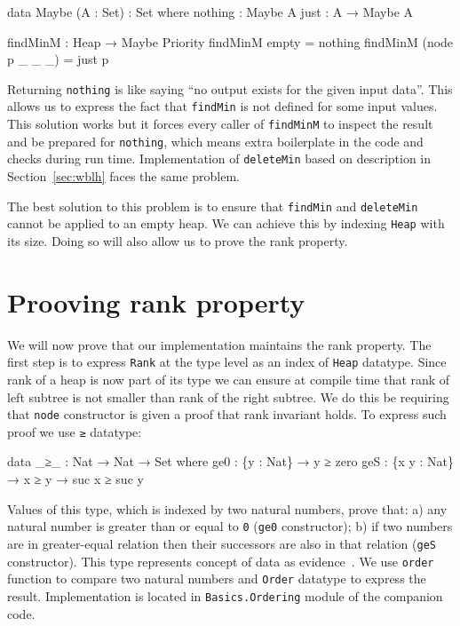 \begin{code}
data Maybe (A : Set) : Set where
  nothing : Maybe A
  just    : A → Maybe A

findMinM : Heap → Maybe Priority
findMinM empty          = nothing
findMinM (node p _ _ _) = just p
\end{code}

\noindent
Returning \texttt{nothing} is like saying ``no output exists for the given input data''. This allows us to express the fact that \texttt{findMin} is not defined for some input values. This solution works but it forces every caller of \texttt{findMinM} to inspect the result and be prepared for \texttt{nothing}, which means extra boilerplate in the code and checks during run time. Implementation of \texttt{deleteMin} based on description in Section~\ref{sec:wblh} faces the same problem.

The best solution to this problem is to ensure that \texttt{findMin} and \texttt{deleteMin} cannot be applied to an empty heap. We can achieve this by indexing \texttt{Heap} with its size. Doing so will also allow us to prove the rank property.

\section[Prooving rank property]{Prooving rank property} \label{sec:rank-property}

We will now prove that our implementation maintains the rank property. The first step is to express \texttt{Rank} at the type level as an index of \texttt{Heap} datatype. Since rank of a heap is now part of its type we can ensure at compile time that rank of left subtree is not smaller than rank of the right subtree. We do this be requiring that \texttt{node} constructor is given a proof that rank invariant holds. To express such proof we use \texttt{≥} datatype:

\begin{code}
data _≥_ : Nat → Nat → Set where
  ge0 : \{y : Nat\} → y ≥ zero
  geS : \{x y : Nat\} → x ≥ y → suc x ≥ suc y
\end{code}
\noindent
Values of this type, which is indexed by two natural numbers, prove that: a) any natural number is greater than or equal to \texttt{0} (\texttt{ge0} constructor); b) if two numbers are in greater-equal relation then their successors are also in that relation (\texttt{geS} constructor). This type represents concept of data as evidence~\cite{AltMcBMcK05}. We use \texttt{order} function to compare two natural numbers and \texttt{Order} datatype to express the result. Implementation is located in \texttt{Basics.Ordering} module of the companion code.

